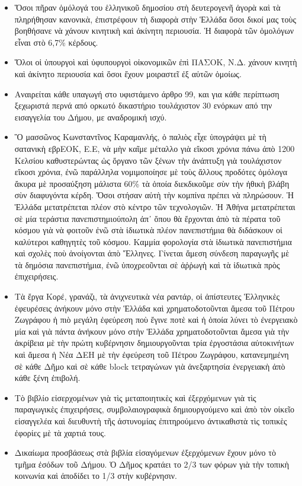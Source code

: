 \documentclass[a4paper]{article}
\begin{document}
\begin{itemize}
\item Ὅσοι πῆραν ὁμόλογά του ἑλληνικοῦ δημοσίου στὴ δευτερογενῆ ἀγορὰ καὶ τὰ πληρήθησαν κανονικὰ, ἐπιστρέφουν τὴ διαφορὰ στὴν Ἑλλάδα ὅσοι δικοί μας τοὺς βοηθήσανε νὰ χάνουν κινητικὴ καὶ ἀκίνητη περιουσία. Ἡ διαφορὰ τῶν ὁμολόγων εἶναι στὸ 6,7\% κέρδους.
\item Ὅλοι οἱ ὑπουργοὶ καὶ ὑφυπουργοὶ οἰκονομικῶν ἐπὶ ΠΑΣΟΚ, Ν.Δ. χάνουν κινητὴ καὶ ἀκίνητο περιουσία καὶ ὅσοι ἔχουν μοιραστεῖ ἐξ αὐτῶν ὁμοίως.
\item Αναιρείται κάθε υπαγωγή στο υφιστάμενο άρθρο 99, και για κάθε περίπτωση ξεχωριστά περνά από ορκωτό δικαστήριο τουλάχιστον 30 ενόρκων από την εισαγγελία του Δήμου, με αναδρομική ισχύ.
\item Ὃ μασσῶνος Κωνσταντῖνος Καραμανλής, ὁ παλιὸς εἶχε ὑπογράψει μὲ τὴ σατανικὴ εβρΕΟΚ, Ε.Ε, νὰ μὴν καῖμε μέταλλο γιὰ εἴκοσι χρόνια πάνω ἀπὸ 1200 Κελσίου καθυστερώντας ὡς ὄργανο τῶν ξένων τὴν ἀνάπτυξη γιὰ τουλάχιστον εἴκοσι χρόνια, ἐνῶ παράλληλα νομιμοποίησε μὲ τοὺς ἄλλους προδότες ὁμόλογα ἄκυρα μὲ προσαύξηση μάλιστα 60\% τὰ ὁποία διεκδικοῦμε σὺν τὴν ἠθικὴ βλάβη σὺν διαφυγόντα κέρδη. Ὅσοι στήσαν αὐτὴ τὴν κομπίνα πρέπει νὰ πληρώσουν. Ἡ Ἑλλάδα μετατρέπεται πλέον στὸ κέντρο τῶν τεχνολογιῶν. Ἡ Ἀθήνα μετατρέπεται σὲ μία τεράστια πανεπιστημιούπολη ἀπ᾿ ὅπου θὰ ἔρχονται ἀπὸ τὰ πέρατα τοῦ κόσμου γιὰ νὰ φοιτοῦν ἐνῶ στὰ ἰδιωτικὰ πλέον πανεπιστήμια θὰ διδάσκουν οἱ καλύτεροι καθηγητὲς τοῦ κόσμου. Καμμία φορολογία στὰ ἰδιωτικὰ πανεπιστήμια καὶ σχολὲς ποὺ ἀνοίγονται ἀπὸ Ἕλληνες. Γίνεται ἄμεση σύνδεση παραγωγῆς μὲ τὰ δημόσια πανεπιστήμια, ἐνῶ ὑποχρεοῦνται σὲ ἀῤῥωγὴ καὶ τὰ ἰδιωτικὰ πρὸς ἐπιχειρήσεις.
\item Τὰ ἔργα Κορέ, γρανάζι, τὰ ἀνιχνευτικὰ νέα ραντάρ, οἱ ἀπίστευτες Ἑλληνικὲς ἐφευρέσεις ἀνήκουν μόνο στὴν Ἑλλάδα καὶ χρηματοδοτοῦνται ἄμεσα τοῦ Πέτρου Ζωγράφου ἡ πιὸ μεγάλη ἐφεύρεση ποὺ ἔγινε ποτὲ καὶ ἡ ὁποία λύνει τὸ ἐνεργειακὸ μία καὶ γιὰ πάντα ἀνήκουν μόνο στὴν Ἑλλάδα χρηματοδοτοῦνται ἄμεσα γιὰ τὴν ἀκρίβεια μὲ τὴν πρώτη κυβέρνησιν δημιουργοῦνται τρία ἐργοστάσια αὐτοκινήτων καὶ ἄμεσα ἡ Νέα ΔΕΗ μὲ τὴν ἐφεύρεση τοῦ Πέτρου Ζωγράφου, κατανεμημένη σὲ κάθε Δῆμο καὶ σὲ κάθε block τετραγώνων γιὰ ἀνεξαρτησία ἐνεργειακὴ ἀπὸ κάθε ξένη ἐπιβολή.
\item Τὸ βιβλίο εἰσερχομένων γιὰ τὶς μεταποιητικὲς καὶ ἐξερχόμενων γιὰ τὶς παραγωγικὲς ἐπιχειρήσεις, συμβολαιογραφικὰ δημιουργούμενο καὶ ἀπὸ τὸν οἰκεῖο εἰσαγγελέα καὶ διευθυντὴ τῆς ἀστυνομίας ἐπιτηρούμενο ἀντικαθιστὰ τὶς τοπικὲς ἐφορίες μὲ τὰ χαρτιά τους.
\item Δικαίωμα προσβάσεως στὰ βιβλία εἰσαγόμενων ἐξερχόμενων ἔχουν μόνο τὸ τμῆμα ἐσόδων τοῦ Δήμου. Ὁ Δῆμος κρατάει το 2/3 των φόρων γιὰ τὴν τοπικὴ κοινωνία καὶ ἀποδίδει το 1/3 στὴν κυβέρνησιν.

\end{itemize}
\end{document}
